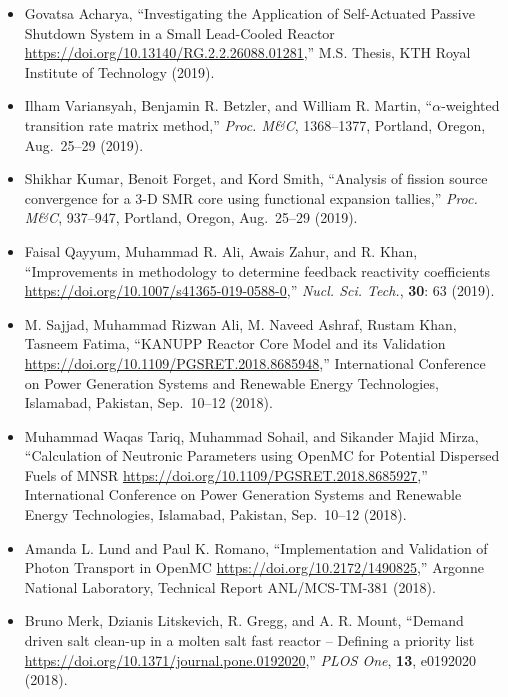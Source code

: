 \begin{itemize}
\item Govatsa Acharya, ``Investigating the Application of Self-Actuated Passive
Shutdown System in a Small Lead-Cooled Reactor
\url{https://doi.org/10.13140/RG.2.2.26088.01281},'' M.S. Thesis, KTH Royal
Institute of Technology (2019).

\item Ilham Variansyah, Benjamin R. Betzler, and William R. Martin,
``$\alpha$-weighted transition rate matrix method,'' \textit{Proc. M\&C}, 1368--1377, Portland,
Oregon, Aug.\ 25--29 (2019).

\item Shikhar Kumar, Benoit Forget, and Kord Smith, ``Analysis of fission source
convergence for a 3-D SMR core using functional expansion tallies,'' \textit{Proc.
M\&C}, 937--947, Portland, Oregon, Aug.\ 25--29 (2019).

\item Faisal Qayyum, Muhammad R. Ali, Awais Zahur, and R. Khan, ``Improvements in
methodology to determine feedback reactivity coefficients
\url{https://doi.org/10.1007/s41365-019-0588-0},'' \textit{Nucl. Sci. Tech.}, \textbf{30}: 63
(2019).

\item M. Sajjad, Muhammad Rizwan Ali, M. Naveed Ashraf, Rustam Khan, Tasneem Fatima,
``KANUPP Reactor Core Model and its Validation
\url{https://doi.org/10.1109/PGSRET.2018.8685948},'' International Conference on
Power Generation Systems and Renewable Energy Technologies, Islamabad,
Pakistan, Sep.\ 10--12 (2018).

\item Muhammad Waqas Tariq, Muhammad Sohail, and Sikander Majid Mirza, ``Calculation
of Neutronic Parameters using OpenMC for Potential Dispersed Fuels of MNSR
\url{https://doi.org/10.1109/PGSRET.2018.8685927},'' International Conference on
Power Generation Systems and Renewable Energy Technologies, Islamabad,
Pakistan, Sep.\ 10--12 (2018).

\item Amanda L. Lund and Paul K. Romano, ``Implementation and Validation of Photon
Transport in OpenMC \url{https://doi.org/10.2172/1490825},'' Argonne National
Laboratory, Technical Report ANL/MCS-TM-381 (2018).

\item Bruno Merk, Dzianis Litskevich, R. Gregg, and A. R. Mount, ``Demand driven
salt clean-up in a molten salt fast reactor -- Defining a priority list
\url{https://doi.org/10.1371/journal.pone.0192020},'' \textit{PLOS One}, \textbf{13},
e0192020 (2018).


\end{itemize}
